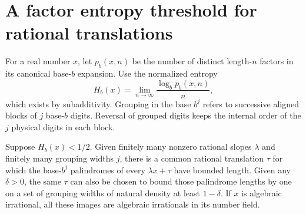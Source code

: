 \section{A factor entropy threshold for rational translations}\label{sec:affine-entropy}

For a real number \(x\), let \(p_b(x,n)\) be the number of distinct length-\(n\) factors in its canonical base-\(b\) expansion. Use the normalized entropy
\[
                 H_b(x)=\lim_{n\to\infty}\frac{\log_b p_b(x,n)}{n},
\]
which exists by subadditivity. Grouping in the base \(b^j\) refers to successive aligned blocks of \(j\) base-\(b\) digits. Reversal of grouped digits keeps the internal order of the \(j\) physical digits in each block.

\begin{theorem}\label{thm:entropy-masks}
Suppose \(H_b(x)<1/2\). Given finitely many nonzero rational slopes \(\lambda\) and finitely many grouping widths \(j\), there is a common rational translation \(\tau\) for which the base-\(b^j\) palindromes of every \(\lambda x+\tau\) have bounded length. Given any \(\delta>0\), the same \(\tau\) can also be chosen to bound those palindrome lengths by one on a set of grouping widths of natural density at least \(1-\delta\). If \(x\) is algebraic irrational, all these images are algebraic irrationals in its number field.
\end{theorem}

